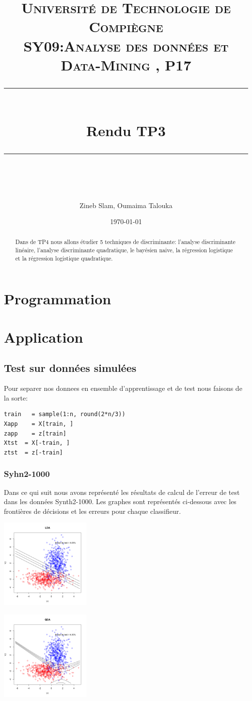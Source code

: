 \documentclass[10pt]{article}
\title{
	\normalfont \normalsize 
	\textsc{Université de Technologie de Compiègne\\ 
		SY09:Analyse des données et Data-Mining , P17} \\
	[10pt]
	\rule{\linewidth}{0.5pt} \\[6pt] 
	\huge Rendu TP3\\
	\rule{\linewidth}{2pt}  \\[10pt]
}
\author{Zineb Slam, Oumaima Talouka}
\date{\normalsize \today}
\begin{document}
	{\let\newpage\relax\maketitle}	
	
		\begin{abstract}
			Dans de TP4 nous allons étudier 5 techniques de discriminante: l'analyse discriminante linéaire, l'analyse discriminante quadratique, le bayésien naive, la régression logistique et la régression logistique quadratique. 
		\end{abstract}
	


\section{Programmation}
\section{Application}
\subsection{Test sur données simulées}
Pour separer nos donnees en ensemble d'apprentissage et de test nous faisons de la sorte:
\begin{lstlisting}
train   = sample(1:n, round(2*n/3)) 
Xapp    = X[train, ]
zapp    = z[train]
Xtst  = X[-train, ]
ztst  = z[-train]
\end{lstlisting}
\subsubsection{Syhn2-1000}
Dans ce qui suit nous avons représenté les résultats de calcul de l'erreur de test dans les données Synth2-1000. Les graphes sont représentés ci-dessous avec les frontières de décisions et les erreurs pour chaque classifieur.

\begin{minipage}{.5\textwidth}
	\includegraphics[width=45mm]{Figures/synth2_lda.png}
\end{minipage}%
\hspace{0.02\linewidth}
\begin{minipage}{.5\textwidth}
	\includegraphics[width=45mm]{Figures/synth2_qda.png}
\end{minipage}
\end{document}
